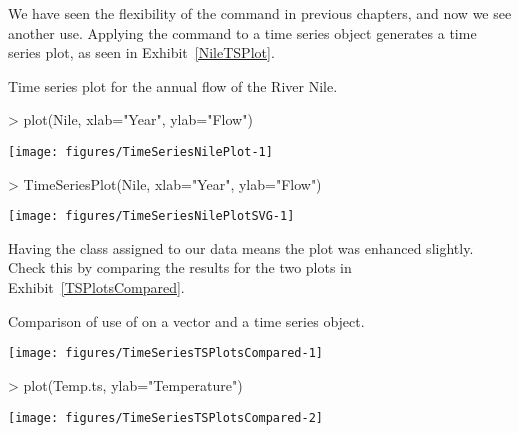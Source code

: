 We have seen the flexibility of the  command in previous chapters, and now we see another use. Applying the  command to a time series object generates a time series plot, as seen in Exhibit~\ref{NileTSPlot}. 
\begin{exhibit} 
\begin{center} 
\caption{Time series plot for the annual flow of the River Nile.} 
\label{NileTSPlot} 

\begin{Schunk}
\begin{Sinput}
> plot(Nile, xlab="Year", ylab="Flow") 
\end{Sinput}

\texttt{[image: figures/TimeSeriesNilePlot-1]} \end{Schunk}

\begin{Schunk}
\begin{Sinput}
> TimeSeriesPlot(Nile, xlab="Year", ylab="Flow") 
\end{Sinput}

\texttt{[image: figures/TimeSeriesNilePlotSVG-1]} \end{Schunk}

\end{center} 
\end{exhibit} 
 
Having the class assigned to our data means the plot was enhanced slightly. Check this by comparing the results for the two plots in Exhibit~\ref{TSPlotsCompared}. 
\begin{exhibit} 
\begin{center} 
\caption{Comparison of use of  on a vector and a time series object.} 
\label{TSPlotsCompared} 

\begin{Schunk}

\texttt{[image: figures/TimeSeriesTSPlotsCompared-1]} \begin{Sinput}
> plot(Temp.ts, ylab="Temperature") 
\end{Sinput}

\texttt{[image: figures/TimeSeriesTSPlotsCompared-2]} \end{Schunk}

\end{center} 
\end{exhibit} 
 
